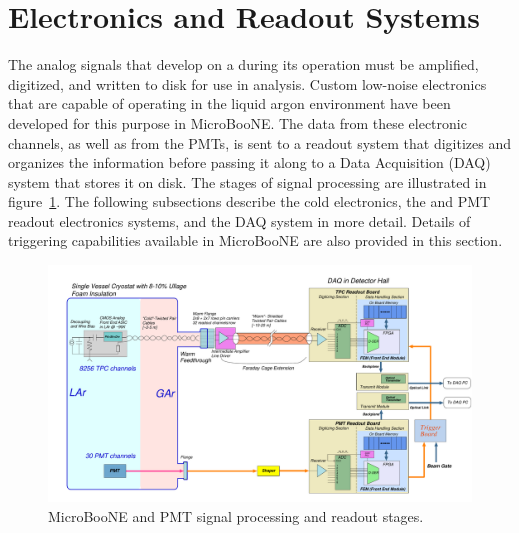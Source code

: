 \section{Electronics and Readout Systems}
\label{sec:electronics}

The analog signals that develop on a \lartpc during its operation must be amplified, digitized, and written to disk for use in analysis.  Custom low-noise electronics that are capable of operating in the liquid argon environment have been developed for this purpose in MicroBooNE.  The data from these \lartpc electronic channels, as well as from the PMTs, is sent to a readout system that digitizes and organizes the information before passing it along to a Data Acquisition (DAQ) system that stores it on disk.  The stages of signal processing are illustrated in figure~\ref{readout_1}.  The following subsections describe the \lartpc cold electronics, the \lartpc and PMT readout electronics systems, and the DAQ system in more detail.  Details of triggering capabilities available in MicroBooNE are also provided in this section.

\begin{figure}
\centering
\includegraphics[width=0.95\linewidth]{./figures/MicroBooNEReadoutScheme.pdf}%
\caption{\label{readout_1}MicroBooNE \lartpc and PMT signal processing and readout stages.}
\end{figure}




